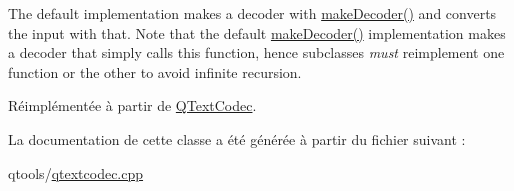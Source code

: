 The default implementation makes a decoder with \hyperlink{class_q_text_codec_a093251759df51159cd3c01f45aeffaac}{make\+Decoder()} and converts the input with that. Note that the default \hyperlink{class_q_text_codec_a093251759df51159cd3c01f45aeffaac}{make\+Decoder()} implementation makes a decoder that simply calls this function, hence subclasses {\itshape must} reimplement one function or the other to avoid infinite recursion. 

Réimplémentée à partir de \hyperlink{class_q_text_codec_a11752c64a75df331b762788ced77ab28}{Q\+Text\+Codec}.



La documentation de cette classe a été générée à partir du fichier suivant \+:\begin{DoxyCompactItemize}
\item 
qtools/\hyperlink{qtextcodec_8cpp}{qtextcodec.\+cpp}\end{DoxyCompactItemize}
